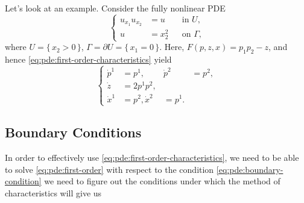 \begin{example}
  Let's look at an example. Consider the fully nonlinear PDE
  \[
    \tag{\(*\)}
    \left\{
      \begin{aligned}
        u_{x_1}u_{x_2}&=u&&\text{in \(U\),}\\
        u&=x_2^2&&\text{on \(\Gamma\),}
      \end{aligned}
    \right.
  \]
  where \(U=\{\,x_2>0\,\}\), \(\Gamma=\partial U=\{\,x_1=0\,\}\). Here,
  \(F(p,z,x)=p_1p_2-z\), and hence
  \eqref{eq:pde:first-order-characteristics} yield
  \[
    \left\{
      \begin{aligned}
        \dot p^1&=p^1,&\dot p^2&=p^2,\\
        \dot z&=2p^1p^2,\\
        \dot x^1&=p^2,\dot x^2&=p^1.
      \end{aligned}
    \right.
  \]
\end{example}

\subsection{Boundary Conditions}
In order to effectively use \eqref{eq:pde:first-order-characteristics}, we
need to be able to solve \eqref{eq:pde:first-order} with respect to the
condition \eqref{eq:pde:boundary-condition} we need to figure out the
conditions under which the method of characteristics will give us


